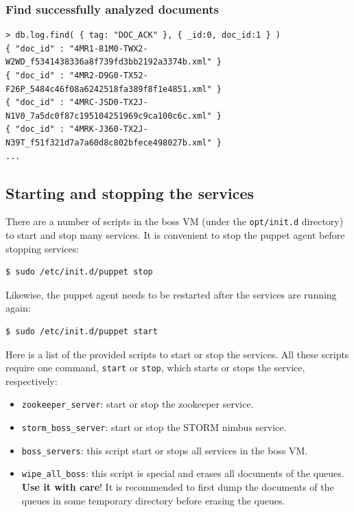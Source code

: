 \documentclass[a4]{article}
\begin{document}
\subsubsection*{Find successfully analyzed documents}

\begin{verbatim}
> db.log.find( { tag: "DOC_ACK" }, { _id:0, doc_id:1 } )
{ "doc_id" : "4MR1-81M0-TWX2-W2WD_f5341438336a8f739fd3bb2192a3374b.xml" }
{ "doc_id" : "4MR2-D9G0-TX52-F26P_5484c46f08a6242518fa389f8f1e4851.xml" }
{ "doc_id" : "4MRC-JSD0-TX2J-N1V0_7a5dc0f87c195104251969c9ca100c6c.xml" }
{ "doc_id" : "4MRK-J360-TX2J-N39T_f51f321d7a7a60d8c802bfece498027b.xml" }
...
\end{verbatim}

\subsection{Starting and stopping the services}
\label{sec:start-stopp-serv}

There are a number of scripts in the boss VM (under the \texttt{opt/init.d}
directory) to start and stop many services. It is convenient to stop the
puppet agent before stopping services:

\begin{verbatim}
$ sudo /etc/init.d/puppet stop
\end{verbatim}

Likewise, the puppet agent needs to be restarted after the services are
running again:

\begin{verbatim}
$ sudo /etc/init.d/puppet start
\end{verbatim}

Here is a list of the provided scripts to start or stop the services. All
these scripts require one command, \texttt{start} or \texttt{stop}, which
starts or stops the service, respectively:
\begin{itemize}
\item \texttt{zookeeper\_server}: start or stop the zookeeper service.
\item \texttt{storm\_boss\_server}: start or stop the STORM nimbus service.
\item \texttt{boss\_servers}: this script start or stops all services in the
  boss VM.
\item \texttt{wipe\_all\_boss}: this script is special and erases all
  documents of the queues. \textbf{Use it with care}! It is recommended to
  first dump the documents of the queues in some temporary directory before
  erasing the queues.
\end{itemize}
\end{document}
